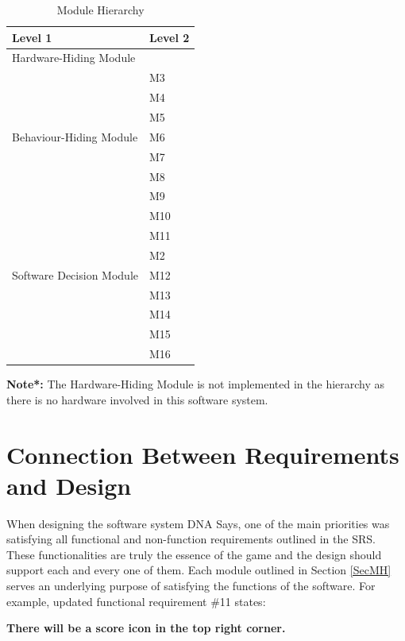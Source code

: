 \documentclass[12pt, titlepage]{article}
\begin{document}
\begin{table}[H]
\centering
\begin{tabular}{p{} p{}}
\toprule
\textbf{Level 1} & \textbf{Level 2}\\
\midrule

{Hardware-Hiding Module} & ~ \\
\midrule

\multirow{7}{0.3\textwidth}{Behaviour-Hiding Module} 
& M3\\
& M4 \\
& M5\\
& M6\\
& M7\\
& M8\\
& M9\\
& M10\\
& M11\\ 
\midrule

\multirow{3}{0.3\textwidth}{Software Decision Module} 
& M2\\
& M12\\
& M13\\
& M14\\
& M15\\
& M16\\

\bottomrule

\end{tabular}
\caption{Module Hierarchy}
\label{TblMH}
\end{table}
\textbf{Note*:} The Hardware-Hiding Module is not implemented in the hierarchy as there is no hardware involved in this software system.

\section{Connection Between Requirements and Design} \label{SecConnection}

\par When designing the software system DNA Says, one of the main priorities was satisfying all functional and non-function requirements outlined in the SRS. These functionalities are truly the essence of the game and the design should support each and every one of them. Each module outlined in Section \ref{SecMH} serves an underlying purpose of satisfying the functions of the software. For example, updated functional requirement \#11 states: 

\begin{center} \textbf{There will be a score icon in the top right corner.} \end{center}
\end{document}
